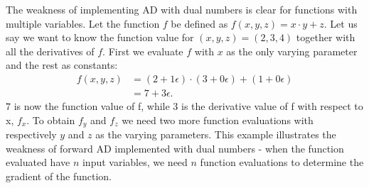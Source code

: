 The weakness of implementing AD with dual numbers is clear for functions with multiple variables. Let the function $f$ be defined as $f(x,y,z) = x\cdot y + z$. Let us say we want to know the function value for $(x,y,z) = (2,3,4)$ together with all the derivatives of $f$. First we evaluate $f$ with $x$ as the only varying parameter and the rest as constants:
\begin{align*}
    f(x,y,z) &= (2+1\epsilon)\cdot(3+0\epsilon) + (1+0\epsilon)\\
        &=7+3\epsilon.
\end{align*}
$7$ is now the function value of f, while 3 is the derivative value of f with respect to x, $f_x$. To obtain $f_y$ and $f_z$ we need two more function evaluations with respectively $y$ and $z$ as the varying parameters. This example illustrates the weakness of forward AD implemented with dual numbers - when the function evaluated have $n$ input variables, we need $n$ function evaluations to determine the gradient of the function.

